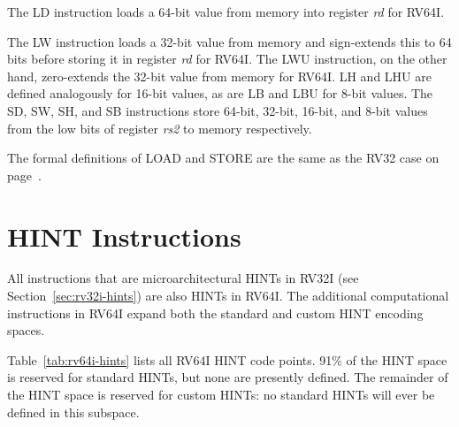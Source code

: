 The LD instruction loads a 64-bit value from memory into register {\em
  rd} for RV64I.

The LW instruction loads a 32-bit value from memory and sign-extends
this to 64 bits before storing it in register {\em rd} for RV64I.  The
LWU instruction, on the other hand, zero-extends the 32-bit value from
memory for RV64I.  LH and LHU are defined analogously for 16-bit
values, as are LB and LBU for 8-bit values.  The SD, SW, SH, and SB
instructions store 64-bit, 32-bit, 16-bit, and 8-bit values from the
low bits of register {\em rs2} to memory respectively.

\begin{formalcomment}
The formal definitions of LOAD and STORE are the same as the RV32 case
on page~\pageref{lbl:ldst32}.
\end{formalcomment}

\section{HINT Instructions}
\label{sec:rv64i-hints}

All instructions that are microarchitectural HINTs in RV32I (see
Section~\ref{sec:rv32i-hints}) are also HINTs in RV64I.  The
additional computational instructions in RV64I expand both the standard and
custom HINT encoding spaces.

Table~\ref{tab:rv64i-hints} lists all RV64I HINT code points.  91\% of the HINT
space is reserved for standard HINTs, but none are presently defined.  The
remainder of the HINT space is reserved for custom HINTs: no standard HINTs
will ever be defined in this subspace.

